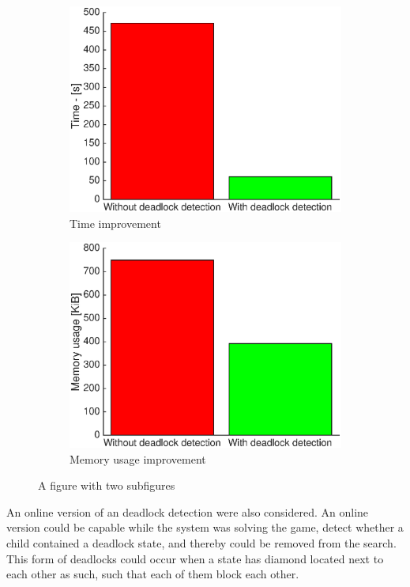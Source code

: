  
 \begin{figure}[H]
\centering
\begin{subfigure}{.5\textwidth}
  \centering
  \includegraphics[width=0.98\linewidth]{images/deadlockImprovement}
  \caption{Time improvement}
  \label{fig:sub1}
\end{subfigure}%
\begin{subfigure}{.5\textwidth}
  \centering
  \includegraphics[width=0.99\linewidth]{images/Memory_usage_1}
  \caption{Memory usage improvement}
  \label{fig:sub2}
\end{subfigure}
\caption{A figure with two subfigures}
\label{fig:test}
\end{figure}
 
An online version of an deadlock detection were also considered.  An online version could be capable while the system was solving the game, detect whether a child contained a deadlock state, and thereby could be removed from the search.  This form of deadlocks could occur when a state has diamond located next to each other as such, such that each of them block each other. \\


